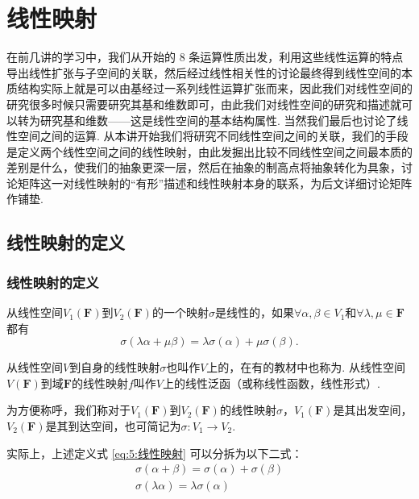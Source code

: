 \chapter{线性映射}

在前几讲的学习中，我们从开始的 8 条运算性质出发，利用这些线性运算的特点导出线性扩张与子空间的关联，然后经过线性相关性的讨论最终得到线性空间的本质结构实际上就是可以由基经过一系列线性运算扩张而来，因此我们对线性空间的研究很多时候只需要研究其基和维数即可，由此我们对线性空间的研究和描述就可以转为研究基和维数——这是线性空间的基本结构属性. 当然我们最后也讨论了线性空间之间的运算. 从本讲开始我们将研究不同线性空间之间的关联，我们的手段是定义两个线性空间之间的线性映射，由此发掘出比较不同线性空间之间最本质的差别是什么，使我们的抽象更深一层，然后在抽象的制高点将抽象转化为具象，讨论矩阵这一对线性映射的``有形''描述和线性映射本身的联系，为后文详细讨论矩阵作铺垫.

\section{线性映射的定义}

\subsection{线性映射的定义}

\begin{definition}[线性映射]\label{def:3:线性映射的定义} 
    从线性空间$V_1(\mathbf{F})$到$V_2(\mathbf{F})$的一个映射$\sigma$是线性的，如果$\forall \alpha,\beta \in V_1$和$\forall \lambda,\mu \in \mathbf{F}$都有
    \begin{equation}\label{eq:5:线性映射}
        \sigma(\lambda\alpha+\mu\beta)=\lambda\sigma(\alpha)+\mu\sigma(\beta).
    \end{equation}

    从线性空间$V$到自身的线性映射$\sigma$也叫作$V$上的，在有的教材中也称为. 从线性空间$V(\mathbf{F})$到域$\mathbf{F}$的线性映射$f$叫作$V$上的线性泛函（或称线性函数，线性形式）.

    为方便称呼，我们称对于$V_1(\mathbf{F})$到$V_2(\mathbf{F})$的线性映射$\sigma$，$V_1(\mathbf{F})$是其出发空间，$V_2(\mathbf{F})$是其到达空间，也可简记为$\sigma: V_1\to V_2$.
\end{definition}
实际上，上述定义式 \ref*{eq:5:线性映射} 可以分拆为以下二式：
\begin{gather} %
    \tag{加性} \sigma(\alpha+\beta)=\sigma(\alpha)+\sigma(\beta) \\
    \tag{齐次性} \sigma(\lambda\alpha)=\lambda\sigma(\alpha)
\end{gather}

